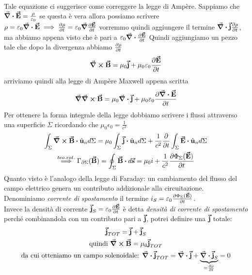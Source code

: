 Tale equazione ci suggerisce come correggere la legge di Ampère. Sappiamo che $\div\vb*{\va{E}}=\frac{\rho}{\varepsilon_0}$
se questa è vera allora possiamo scrivere $\rho=\varepsilon_0\div\vb*{\va{E}} \implies \pdv{\rho}{t}=\varepsilon_0\grad\pdv{\vb*{\va{E}}}{t}$
vorremmo quindi aggiungere il termine $\div\vb*{\va{j}} \pdv{\rho}{t}$, ma abbiamo appena visto che è pari a $\varepsilon_0\div\pdv{\vb*{\va{E}}}{t}$
Quindi aggiungiamo un pezzo tale che dopo la divergenza abbiamo $\pdv{\rho}{t}$
\begin{equation}
	\curl\vb*{\va{B}}=\mu_0 \vb*{\va{j}}+\mu_0\varepsilon_0\pdv{\vb*{\va{E}}}{t}
\end{equation}
arriviamo quindi alla legge di Ampère Maxwell appena scritta
\begin{gather*}
	\grad\curl\vb*{\va{B}}=\mu_0\div\vb*{\va{j}}+\mu_0\varepsilon_0\pdv{\div\vb*{\va{E}}}{t}
\end{gather*}
Per ottenere la forma integrale della legge dobbiamo scrivere i flussi attraverso una superficie $\Sigma$ ricordando che $\mu_0\epsilon_0=\frac{1}{c^2}$
\begin{gather*}
	\int_\Sigma\curl\vba B\vdot\vbh{u}_n d\Sigma = \mu_0\int_\Sigma\vba j\vdot\vbh u_n d\Sigma +\frac{1}{c^2}\pdv{t}\int_\Sigma \vba E\vdot\vbh u_n d\Sigma\\
	\stackrel{teo.rot.}{\implies} \Gamma_{\partial\Sigma}(\vba B)= \oint_\Sigma \vba B\vdot d\vba s= \mu_0 i + \frac{1}{c^2}\pdv{\Phi_\Sigma (\vba E)}{t}
\end{gather*}
Quanto visto è l'analogo della legge di Faraday: un cambiamento del flusso del campo elettrico genera un contributo addizionale alla circuitazione.\\
Denominiamo \textit{corrente di spostamento} il termine $i_S=\varepsilon_0\pdv{\Phi_\Sigma(\vb*{\va{E}})}{t}$. \\
Invece la densità di corrente $\vb*{\va{j}}_S=\varepsilon_0\pdv{\vb*{\va{E}}}{t}$ è detta \textit{densità di corrente di spostamento} perché combinandola con un contributo pari a $\vb*{\va{j}}$, potrei definire una $\vb*{\va{j}}$ totale:
\begin{gather*}
	\vb*{\va{j}}_{TOT}=\vb*{\va{j}}+\vb*{\va{j}}_S\\
	\text{quindi } \curl\vb*{\va{B}}=\mu_0\vb*{\va{j}}_{TOT}\\
	\text{da cui otteniamo un campo solenoidale: } \div\vb*{\va{j}}_{TOT}=\div\vb*{\va{j}}+\underbrace{\div\vb*{\va{j}}_S}_{=\pdv{\rho}{t}}=0
\end{gather*}

